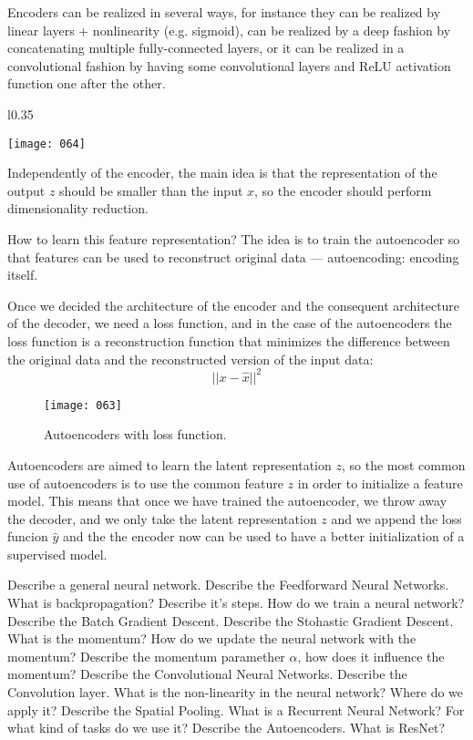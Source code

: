 Encoders can be realized in several ways, for instance they can be realized by linear layers + nonlinearity (e.g. sigmoid), can be realized by a deep fashion by concatenating multiple fully-connected layers, or it can be realized in a convolutional fashion by having some convolutional layers and ReLU activation function one after the other.

\begin{wrapfigure}{l}{0.35\textwidth}
    \begin{center}
        \texttt{[image: 064]}
        \caption{}
    \end{center}
    \label{fig:064}
\end{wrapfigure}

Independently of the encoder, the main idea is that the representation of the output \(z\) should be smaller than the input \(x\), so the encoder should perform dimensionality reduction. 

How to learn this feature representation? The idea is to train the autoencoder so that features can be used to reconstruct original data --- autoencoding: encoding itself.

Once we decided the architecture of the encoder and the consequent architecture of the decoder, we need a loss function, and in the case of the autoencoders the loss function is a reconstruction function that minimizes the difference between the original data and the reconstructed version of the input data:
\begin{equation}
    ||x - \hat{x}||^2
\end{equation}
\begin{figure}[h!]
    \centering
    \texttt{[image: 063]}
    \caption{Autoencoders with loss function.}
    \label{fig:063}
\end{figure}

Autoencoders are aimed to learn the latent representation \(z\), so the most common use of autoencoders is to use the common feature \(z\) in order to initialize a feature model. This means that once we have trained the autoencoder, we throw away the decoder, and we only take the latent representation \(z\) and we append the loss funcion \(\hat{y}\) and the the encoder now can be used to have a better initialization of a supervised model.

\newpage
\begin{exercise}[topsep=20pt,itemsep=10pt]
    \ex Describe a general neural network.
    \ex[!] Describe the Feedforward Neural Networks.
    \ex[!] What is backpropagation? Describe it's steps.
    \ex How do we train a neural network?
    \ex Describe the Batch Gradient Descent.
    \ex Describe the Stohastic Gradient Descent.
    \ex[!] What is the momentum? How do we update the neural network with the momentum?
    \ex Describe the momentum paramether \(\alpha\), how does it influence the momentum?
    \ex[!] Describe the Convolutional Neural Networks.
    \ex[!] Describe the Convolution layer.
    \ex[!] What is the non-linearity in the neural network? Where do we apply it?
    \ex[!] Describe the Spatial Pooling.
    \ex[!] What is a Recurrent Neural Network? For what kind of tasks do we use it?
    \ex[!] Describe the Autoencoders.
    \ex[!] What is ResNet?
\end{exercise}